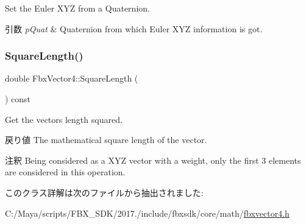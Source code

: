 Set the Euler X\+YZ from a Quaternion. 
\begin{DoxyParams}{引数}
{\em p\+Quat} & Quaternion from which Euler X\+YZ information is got. \\
\hline
\end{DoxyParams}
\mbox{\label{class_fbx_vector4_ad77a15ae1c7c19c49541277eed7ad578}} 
\subsubsection{\texorpdfstring{Square\+Length()}{SquareLength()}}
{\footnotesize\ttfamily double Fbx\+Vector4\+::\+Square\+Length (\begin{DoxyParamCaption}{ }\end{DoxyParamCaption}) const}

Get the vector\textquotesingle{}s length squared. \begin{DoxyReturn}{戻り値}
The mathematical square length of the vector. 
\end{DoxyReturn}
\begin{DoxyRemark}{注釈}
Being considered as a X\+YZ vector with a weight, only the first 3 elements are considered in this operation. 
\end{DoxyRemark}


このクラス詳解は次のファイルから抽出されました\+:\begin{DoxyCompactItemize}
\item 
C\+:/\+Maya/scripts/\+F\+B\+X\+\_\+\+S\+D\+K/2017./include/fbxsdk/core/math/\hyperlink{fbxvector4_8h}{fbxvector4.\+h}\end{DoxyCompactItemize}
